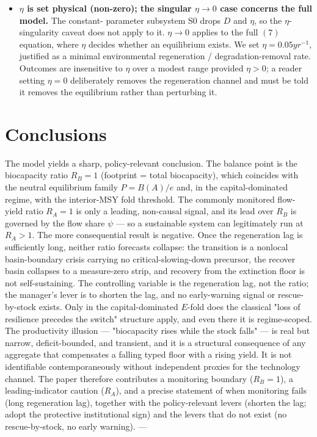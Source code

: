 \documentclass[11pt]{article}
\begin{document}
\begin{itemize}
\item \textbf{$\eta{}$ is set physical (non-zero); the singular $\eta{} \to{} 0$ case concerns the full model.} The constant- parameter subsystem S0 drops $D$ and $\eta{}$, so the \ensuremath{\eta{}}-singularity caveat does not apply to it. $\eta{} \to{} 0$ applies to the full $(7)$ equation, where $\eta{}$ decides whether an equilibrium exists. We set $\eta{} = 0.05 yr^{-1}$, justified as a minimal environmental regeneration / degradation-removal rate. Outcomes are insensitive to $\eta{}$ over a modest range provided $\eta{} > 0$; a reader setting $\eta{} = 0$ deliberately removes the regeneration channel and must be told it removes the equilibrium rather than perturbing it.
\end{itemize}

\section{Conclusions}

The model yields a sharp, policy-relevant conclusion. The balance point is the biocapacity ratio $R_{B} = 1$ (footprint = total biocapacity), which coincides with the neutral equilibrium family $P = B(A)/e$ and, in the capital-dominated regime, with the interior-MSY fold threshold. The commonly monitored flow-yield ratio $R_{A} = 1$ is only a leading, non-causal signal, and its lead over $R_{B}$ is governed by the flow share $\psi{}$ — so a sustainable system can legitimately run at $R_{A} > 1$. The more consequential result is negative. Once the regeneration lag is sufficiently long, neither ratio forecasts collapse: the transition is a nonlocal basin-boundary crisis carrying no critical-slowing-down precursor, the recover basin collapses to a measure-zero strip, and recovery from the extinction floor is not self-sustaining. The controlling variable is the regeneration lag, not the ratio; the manager's lever is to shorten the lag, and no early-warning signal or rescue-by-stock exists. Only in the capital-dominated $E$-fold does the classical "loss of resilience precedes the switch" structure apply, and even there it is regime-scoped. The productivity illusion — "biocapacity rises while the stock falls" — is real but narrow, deficit-bounded, and transient, and it is a structural consequence of any aggregate that compensates a falling typed floor with a rising yield. It is not identifiable contemporaneously without independent proxies for the technology channel. The paper therefore contributes a monitoring boundary ($R_{B} = 1$), a leading-indicator caution ($R_{A}$), and a precise statement of when monitoring fails (long regeneration lag), together with the policy-relevant levers (shorten the lag; adopt the protective institutional sign) and the levers that do not exist (no rescue-by-stock, no early warning). ---
\end{document}
